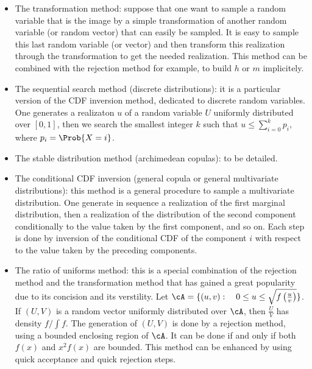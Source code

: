 {\begin{itemize}
  \item The transformation method: suppose that one want to sample a random variable that is the image by a simple transformation of another random variable (or random vector) that can easily be sampled. It is easy to sample this last random variable (or vector) and then transform this realization through the transformation to get the needed realization. This method can be combined with the rejection method for example, to build $h$ or $m$ implicitely.
  \item The sequential search method (discrete distributions): it is a particular version of the CDF inversion method, dedicated to discrete random variables. One generates a realizaton $u$ of a random variable $U$ uniformly distributed over $[0, 1]$, then we search the smallest integer $k$ such that $u\leq\sum_{i=0}^kp_i$, where $p_i=\Prob{X=i}$.
  \item The stable distribution method (archimedean copulas): to be detailed.
  \item The conditional CDF inversion (general copula or general multivariate distributions): this method is a general procedure to sample a multivariate distribution. One generate in sequence a realization of the first marginal distribution, then a realization of the distribution of the second component conditionally to the value taken by the first component, and so on. Each step is done by inversion of the conditional CDF of the component $i$ with respect to the value taken by the preceding components.
  \item The ratio of uniforms method: this is a special combination of the rejection method and the transformation method that has gained a great popularity due to its concision and its verstility. Let $\cA=\{(u,v):\quad 0\leq u\leq \sqrt{f\left(\frac{u}{v}\right)}\}$. If $(U,V)$ is a random vector uniformly distributed over $\cA$, then $\frac{U}{V}$ has density $f/\int f$. The generation of $(U, V)$ is done by a rejection method, using a bounded enclosing region of $\cA$. It can be done if and only if both $f(x)$ and $x^2f(x)$ are bounded. This method can be enhanced by using quick acceptance and quick rejection steps.

\end{itemize}}
